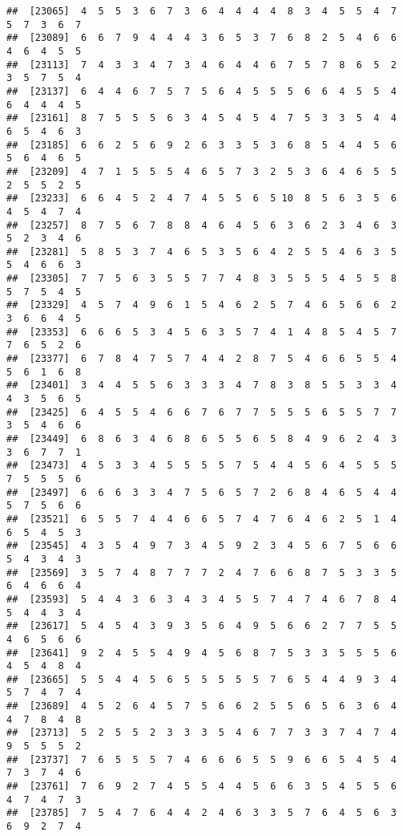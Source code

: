 \documentclass[
]{book}
\begin{document}
\begin{verbatim}
##  [23065]  4  5  5  3  6  7  3  6  4  4  4  4  8  3  4  5  5  4  7  5  7  3  6  7
##  [23089]  6  6  7  9  4  4  4  3  6  5  3  7  6  8  2  5  4  6  6  4  6  4  5  5
##  [23113]  7  4  3  3  4  7  3  4  6  4  4  6  7  5  7  8  6  5  2  3  5  7  5  4
##  [23137]  6  4  4  6  7  5  7  5  6  4  5  5  5  6  6  4  5  5  4  6  4  4  4  5
##  [23161]  8  7  5  5  5  6  3  4  5  4  5  4  7  5  3  3  5  4  4  6  5  4  6  3
##  [23185]  6  6  2  5  6  9  2  6  3  3  5  3  6  8  5  4  4  5  6  5  6  4  6  5
##  [23209]  4  7  1  5  5  5  4  6  5  7  3  2  5  3  6  4  6  5  5  2  5  5  2  5
##  [23233]  6  6  4  5  2  4  7  4  5  5  6  5 10  8  5  6  3  5  6  4  5  4  7  4
##  [23257]  8  7  5  6  7  8  8  4  6  4  5  6  3  6  2  3  4  6  3  5  2  3  4  6
##  [23281]  5  8  5  3  7  4  6  5  3  5  6  4  2  5  5  4  6  3  5  5  4  6  6  3
##  [23305]  7  7  5  6  3  5  5  7  7  4  8  3  5  5  5  4  5  5  8  5  7  5  4  5
##  [23329]  4  5  7  4  9  6  1  5  4  6  2  5  7  4  6  5  6  6  2  3  6  6  4  5
##  [23353]  6  6  6  5  3  4  5  6  3  5  7  4  1  4  8  5  4  5  7  7  6  5  2  6
##  [23377]  6  7  8  4  7  5  7  4  4  2  8  7  5  4  6  6  5  5  4  5  6  1  6  8
##  [23401]  3  4  4  5  5  6  3  3  3  4  7  8  3  8  5  5  3  3  4  4  3  5  6  5
##  [23425]  6  4  5  5  4  6  6  7  6  7  7  5  5  5  6  5  5  7  7  3  5  4  6  6
##  [23449]  6  8  6  3  4  6  8  6  5  5  6  5  8  4  9  6  2  4  3  3  6  7  7  1
##  [23473]  4  5  3  3  4  5  5  5  5  7  5  4  4  5  6  4  5  5  5  7  5  5  5  6
##  [23497]  6  6  6  3  3  4  7  5  6  5  7  2  6  8  4  6  5  4  4  5  7  5  6  6
##  [23521]  6  5  5  7  4  4  6  6  5  7  4  7  6  4  6  2  5  1  4  6  5  4  5  3
##  [23545]  4  3  5  4  9  7  3  4  5  9  2  3  4  5  6  7  5  6  6  5  4  3  4  3
##  [23569]  3  5  7  4  8  7  7  7  2  4  7  6  6  8  7  5  3  3  5  6  4  6  6  4
##  [23593]  5  4  4  3  6  3  4  3  4  5  5  7  4  7  4  6  7  8  4  5  4  4  3  4
##  [23617]  5  4  5  4  3  9  3  5  6  4  9  5  6  6  2  7  7  5  5  4  6  5  6  6
##  [23641]  9  2  4  5  5  4  9  4  5  6  8  7  5  3  3  5  5  5  6  4  5  4  8  4
##  [23665]  5  5  4  4  5  6  5  5  5  5  5  7  6  5  4  4  9  3  4  5  7  4  7  4
##  [23689]  4  5  2  6  4  5  7  5  6  6  2  5  5  6  5  6  3  6  4  4  7  8  4  8
##  [23713]  5  2  5  5  2  3  3  3  5  4  6  7  7  3  3  7  4  7  4  9  5  5  5  2
##  [23737]  7  6  5  5  5  7  4  6  6  6  5  5  9  6  6  5  4  5  4  7  3  7  4  6
##  [23761]  7  6  9  2  7  4  5  5  4  4  5  6  6  3  5  4  5  5  6  4  7  4  7  3
##  [23785]  7  5  4  7  6  4  4  2  4  6  3  3  5  7  6  4  5  6  3  6  9  2  7  4

\end{verbatim}
\end{document}
